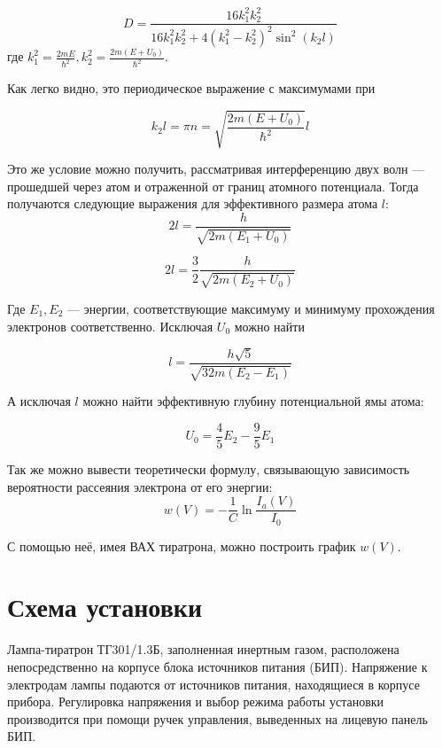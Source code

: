 \documentclass[a4paper,12pt]{article} %
\begin{document}
	\begin{equation}
		D = \frac{16 k_1^2 k_2^2}{16k_1^2 k_2^2 + 4\left(k_1^2-k_2^2\right)^2\sin^2\left(k_2 l\right)}
	\end{equation}
	где $k_1^2 = \frac{2mE}{\hbar^2}, k_2^2 = \frac{2m(E + U_0)}{\hbar^2}$.
	
	Как легко видно, это периодическое выражение с максимумами при 
	
	\begin{equation}
		k_2 l = \pi n = \sqrt{\frac{2m(E + U_0)}{\hbar^2}}l
	\end{equation}
	
	Это же условие можно получить, рассматривая интерференцию двух волн --- прошедшей через атом и отраженной от границ атомного потенциала. Тогда получаются следующие выражения для эффективного размера атома $l$:
	\begin{equation}
		2l = \frac{h}{\sqrt{2m(E_1 + U_0)}}
	\end{equation}
	
	\begin{equation}
		2l = \frac{3}{2}\frac{h}{\sqrt{2m(E_2 + U_0)}}
	\end{equation}
	
	Где $E_1, E_2$ --- энергии, соответствующие максимуму и минимуму прохождения электронов соответственно. Исключая $U_0$ можно найти 
	
	\begin{equation}
		l = \frac{h\sqrt{5}}{\sqrt{32m(E_2 - E_1)}}
	\end{equation}
	
	А исключая $l$ можно найти эффективную глубину потенциальной ямы атома:
	
	\begin{equation}
		U_0 = \frac{4}{5}E_2 - \frac{9}{5}E_1
	\end{equation}
	
	Так же можно вывести теоретически формулу, связывающую зависимость вероятности рассеяния электрона от его энергии:
	\begin{equation}
		w(V) = -\frac{1}{C} \ln \frac{I_a(V)}{I_0}
	\end{equation}
	
	С помощью неё, имея ВАХ тиратрона, можно построить график $w(V)$.
	
	\section*{Схема установки}
	Лампа-тиратрон ТГ301/1.3Б, заполненная инертным газом, расположена непосредственно на корпусе блока источников питания (БИП). Напряжение к электродам лампы подаются от источников питания, находящиеся в корпусе прибора. Регулировка напряжения и выбор режима работы установки производится при помощи ручек управления, выведенных на лицевую панель БИП.
	
\end{document}
